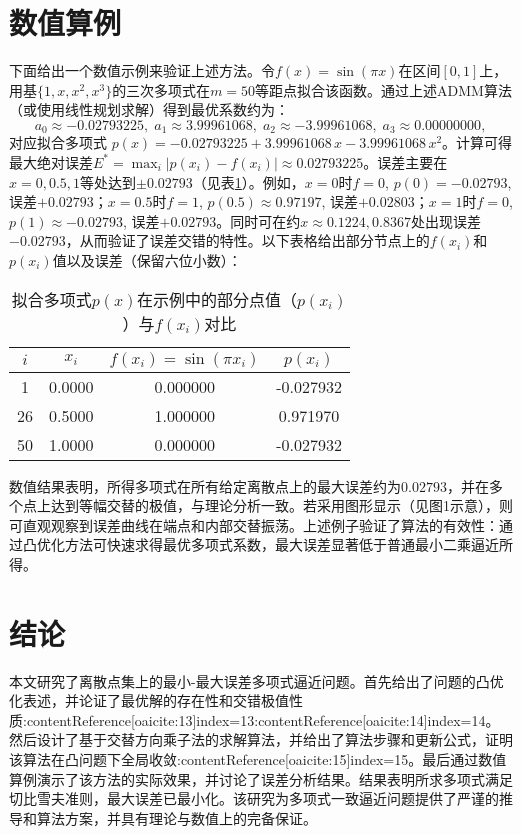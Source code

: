 \documentclass{article}
\begin{document}
\section{数值算例}
下面给出一个数值示例来验证上述方法。令$f(x)=\sin(\pi x)$在区间$[0,1]$上，用基$\{1,x,x^2,x^3\}$的三次多项式在$m=50$等距点拟合该函数。通过上述ADMM算法（或使用线性规划求解）得到最优系数约为：
\[
a_0\approx -0.02793225,\;
a_1\approx 3.99961068,\;
a_2\approx -3.99961068,\;
a_3\approx 0.00000000,
\]
对应拟合多项式
$p(x)=-0.02793225 +3.99961068\,x -3.99961068\,x^2$。计算可得最大绝对误差$E^*=\max_i|p(x_i)-f(x_i)|\approx0.02793225$。误差主要在$x=0,0.5,1$等处达到$\pm0.02793$（见表\ref{tab:err}）。例如，$x=0$时$f=0$, $p(0)=-0.02793$, 误差$+0.02793$；$x=0.5$时$f=1$, $p(0.5)\approx0.97197$, 误差$+0.02803$；$x=1$时$f=0$, $p(1)\approx -0.02793$, 误差$+0.02793$。同时可在约$x\approx0.1224,0.8367$处出现误差$-0.02793$，从而验证了误差交错的特性。以下表格给出部分节点上的$f(x_i)$和$p(x_i)$值以及误差（保留六位小数）：
\begin{table}[ht]
\centering
\begin{tabular}{c|c c c}
$i$ & $x_i$ & $f(x_i)=\sin(\pi x_i)$ & $p(x_i)$ \\
\hline
1 & 0.0000 & 0.000000 & -0.027932 \\
26 & 0.5000 & 1.000000 & 0.971970 \\
50 & 1.0000 & 0.000000 & -0.027932 \\
\end{tabular}
\caption{拟合多项式$p(x)$在示例中的部分点值（$p(x_i)$）与$f(x_i)$对比}
\label{tab:err}
\end{table}

数值结果表明，所得多项式在所有给定离散点上的最大误差约为$0.02793$，并在多个点上达到等幅交替的极值，与理论分析一致。若采用图形显示（见图1示意），则可直观观察到误差曲线在端点和内部交替振荡。上述例子验证了算法的有效性：通过凸优化方法可快速求得最优多项式系数，最大误差显著低于普通最小二乘逼近所得。

\section{结论}
本文研究了离散点集上的最小-最大误差多项式逼近问题。首先给出了问题的凸优化表述，并论证了最优解的存在性和交错极值性质:contentReference[oaicite:13]{index=13}:contentReference[oaicite:14]{index=14}。然后设计了基于交替方向乘子法的求解算法，并给出了算法步骤和更新公式，证明该算法在凸问题下全局收敛:contentReference[oaicite:15]{index=15}。最后通过数值算例演示了该方法的实际效果，并讨论了误差分析结果。结果表明所求多项式满足切比雪夫准则，最大误差已最小化。该研究为多项式一致逼近问题提供了严谨的推导和算法方案，并具有理论与数值上的完备保证。 
\end{document}
